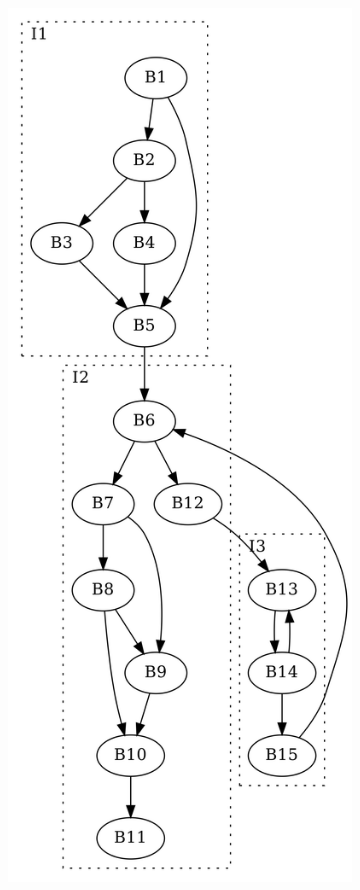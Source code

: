 \begin{figure}[htbp]
\begin{subfigure}[b]{0.30\textwidth}
		\includegraphics[width=\textwidth]{inc/3_background/interval_method/derived_sequence_of_graphs/G_1.png}

\end{subfigure}
\end{figure}
